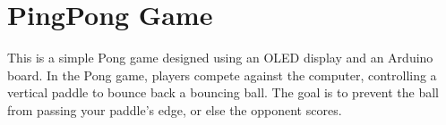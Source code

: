 \documentclass[a4paper,11pt,english]{sphinxmanual}
\begin{document}
\begin{enumerate}
\begin{sphinxVerbatim}[commandchars=\\\{\}]
\PYG{p}{[}\PYG{p}{]}\PYG{p}{[}\PYG{p}{]}\PYG{p}{[}\PYG{p}{]}
\end{sphinxVerbatim}

\end{enumerate}

\sphinxstepscope


\section{Ping\sphinxhyphen{}Pong Game}
\label{\detokenize{Extension_Project/Ping-Pong_Game:ping-pong-game}}\label{\detokenize{Extension_Project/Ping-Pong_Game:ext-ping-pong-game}}\label{\detokenize{Extension_Project/Ping-Pong_Game::doc}}
\sphinxAtStartPar
This is a simple Pong game designed using an OLED display and an Arduino board.
In the Pong game, players compete against the computer, controlling a vertical paddle to bounce back a bouncing ball.
The goal is to prevent the ball from passing your paddle’s edge, or else the opponent scores.
\end{document}
